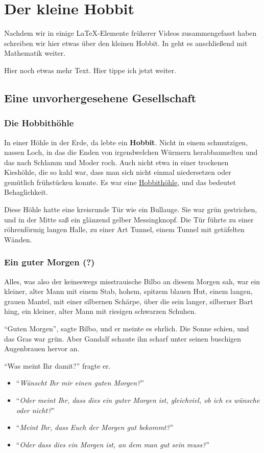 \chapter{Der kleine Hobbit}
%
\label{chap:hobbit}
Nachdem wir in  einige \LaTeX{}-Elemente
früherer Videos zusammengefasst haben schreiben wir hier etwas über den
kleinen Hobbit. In  geht es anschließend
mit Mathematik weiter.

Hier noch etwas mehr Text. Hier tippe ich jetzt weiter.
%
\section{Eine unvorhergesehene Gesellschaft}

\subsection*{Die Hobbithöhle}
In einer Höhle in der Erde, da lebte ein \textbf{Hobbit}. Nicht in
einem schmutzigen, nassen Loch, in das die Enden von irgendwelchen
Würmern herabbaumelten und das nach Schlamm und Moder roch. Auch nicht
etwa in einer trockenen Kieshöhle, die so kahl war, dass man sich
nicht einmal niedersetzen oder gemütlich frühstücken konnte. Es war
eine \underline{Hobbithöhle}, und das bedeutet Behaglichkeit.

Diese Höhle hatte eine kreisrunde Tür wie ein Bullauge. Sie war grün
gestrichen, und in der Mitte saß ein glänzend gelber Messingknopf. Die
Tür führte zu einer röhrenförmig langen Halle, zu einer Art Tunnel,
einem Tunnel mit getäfelten Wänden.

\subsection*{Ein guter Morgen (?)}
Alles, was also der keineswegs misstrauische Bilbo an diesem Morgen
sah, war ein kleiner, alter Mann mit einem Stab, hohem, spitzem blauen
Hut, einem langen, grauen Mantel, mit einer silbernen Schärpe, über
die sein langer, silberner Bart hing, ein kleiner, alter Mann mit
riesigen schwarzen Schuhen.

\enquote{Guten Morgen}, sagte Bilbo, und er meinte es ehrlich. Die
Sonne schien, und das Gras war grün. Aber Gandalf schaute ihn scharf
unter seinen buschigen Augenbrauen hervor an.

\enquote{Was meint Ihr damit?} fragte er. 
\begin{itemize}
  \item \enquote{\emph{Wünscht Ihr mir einen guten Morgen?}}

  \item \enquote{\emph{Oder meint Ihr, dass dies ein guter Morgen
        ist, gleichviel, ob ich es wünsche oder nicht?}}
  \item \enquote{\emph{Meint Ihr, dass Euch der Morgen gut bekommt?}}
  \item \enquote{\emph{Oder dass dies ein Morgen ist, an dem man gut
        sein muss?}}
\end{itemize}

